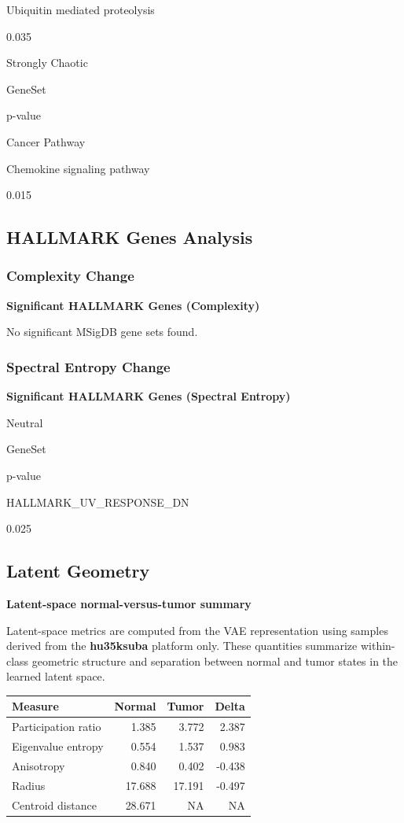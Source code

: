 \documentclass[
  letterpaper,
  DIV=11,
  numbers=noendperiod,
  openany,
  oneside]{scrreprt}
\begin{document}
Ubiquitin mediated proteolysis

0.035

Strongly Chaotic

GeneSet

p-value

Cancer Pathway

Chemokine signaling pathway

0.015

\subsection{HALLMARK Genes Analysis}

\subsubsection{Complexity Change}

\textbf{Significant HALLMARK Genes (Complexity)}

No significant MSigDB gene sets found.

\subsubsection{Spectral Entropy Change}

\textbf{Significant HALLMARK Genes (Spectral Entropy)}

Neutral

GeneSet

p-value

HALLMARK\_UV\_RESPONSE\_DN

0.025

\subsection{Latent Geometry}

\textbf{Latent-space normal-versus-tumor summary}

Latent-space metrics are computed from the VAE representation using
samples derived from the \textbf{hu35ksuba} platform only. These
quantities summarize within-class geometric structure and separation
between normal and tumor states in the learned latent space.

\begin{longtable}[]{@{}lrrr@{}}
\toprule\noalign{}
Measure & Normal & Tumor & Delta \\
\midrule\noalign{}
\endhead
\bottomrule\noalign{}
\endlastfoot
Participation ratio & 1.385 & 3.772 & 2.387 \\
Eigenvalue entropy & 0.554 & 1.537 & 0.983 \\
Anisotropy & 0.840 & 0.402 & -0.438 \\
Radius & 17.688 & 17.191 & -0.497 \\
Centroid distance & 28.671 & NA & NA \\
\end{longtable}
\end{document}
